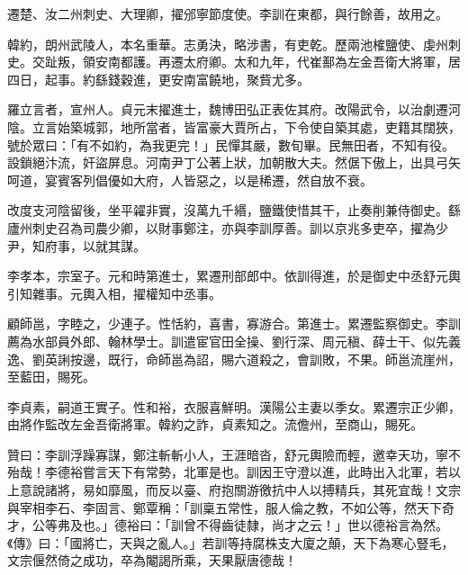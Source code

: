 \begin{pinyinscope}
 遷楚、汝二州刺史、大理卿，擢邠寧節度使。李訓在東都，與行餘善，故用之。



 韓約，朗州武陵人，本名重華。志勇決，略涉書，有吏乾。歷兩池榷鹽使、虔州刺史。交趾叛，領安南都護。再遷太府卿。太和九年，代崔鄯為左金吾衛大將軍，居四日，起事。約繇錢穀進，更安南富饒地，聚貲尤多。



 羅立言者，宣州人。貞元末擢進士，魏博田弘正表佐其府。改陽武令，以治劇遷河陰。立言始築城郭，地所當者，皆富豪大賈所占，下令使自築其處，吏籍其闊狹，號於眾曰：「有不如約，為我更完！」民憚其嚴，數旬畢。民無田者，不知有役。設鎖絕汴流，奸盜屏息。河南尹丁公著上狀，加朝散大夫。然倨下傲上，出具弓矢呵道，宴賓客列倡優如大府，人皆惡之，以是稀遷，然自放不衰。



 改度支河陰留後，坐平糴非實，沒萬九千緡，鹽鐵使惜其干，止奏削兼侍御史。繇廬州刺史召為司農少卿，以財事鄭注，亦與李訓厚善。訓以京兆多吏卒，擢為少尹，知府事，以就其謀。



 李孝本，宗室子。元和時第進士，累遷刑部郎中。依訓得進，於是御史中丞舒元輿引知雜事。元輿入相，擢權知中丞事。



 顧師邕，字睦之，少連子。性恬約，喜書，寡游合。第進士。累遷監察御史。李訓薦為水部員外郎、翰林學士。訓遣宦官田全操、劉行深、周元稹、薛士干、似先義逸、劉英誗按邊，既行，命師邕為詔，賜六道殺之，會訓敗，不果。師邕流崖州，至藍田，賜死。



 李貞素，嗣道王實子。性和裕，衣服喜鮮明。漢陽公主妻以季女。累遷宗正少卿，由將作監改左金吾衛將軍。韓約之詐，貞素知之。流儋州，至商山，賜死。



 贊曰：李訓浮躁寡謀，鄭注斬斬小人，王涯暗沓，舒元輿險而輕，邀幸天功，寧不殆哉！李德裕嘗言天下有常勢，北軍是也。訓因王守澄以進，此時出入北軍，若以上意說諸將，易如靡風，而反以臺、府抱關游徼抗中人以搏精兵，其死宜哉！文宗與宰相李石、李固言、鄭覃稱：「訓稟五常性，服人倫之教，不如公等，然天下奇才，公等弗及也。」德裕曰：「訓曾不得齒徒隸，尚才之云！」世以德裕言為然。《傳》曰：「國將亡，天與之亂人。」若訓等持腐株支大廈之顛，天下為寒心豎毛，文宗偃然倚之成功，卒為閹謁所乘，天果厭唐德哉！



\end{pinyinscope}